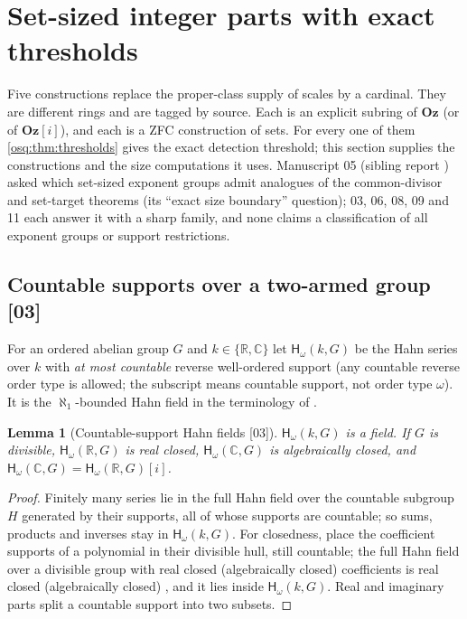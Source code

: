 \documentclass[11pt,letterpaper]{article}
\numberwithin{equation}{section}
\newtheorem{lemma}[lemma]{Lemma}
\theoremstyle{definition}
\theoremstyle{remark}
\theoremstyle{plain}
\newcommand{\Oz}{\mathbf{Oz}}
\newcommand{\GOz}{\Oz[i]}
\newcommand{\R}{\mathbb R}
\newcommand{\C}{\mathbb C}
\newcommand{\Hc}[2]{\mathsf H_{\omega}(#1,#2)}
\newcommand{\src}[1]{\textup{\textsf{[#1]}}}
\begin{document}
\section{Set-sized integer parts with exact thresholds}\label{osq:sec:models}

Five constructions replace the proper-class supply of scales by a cardinal. They are
different rings and are tagged by source. Each is an explicit subring of $\Oz$ (or of
$\GOz$), and each is a ZFC construction of sets. For every one of them
\cref{osq:thm:thresholds} gives the exact detection threshold; this section supplies the
constructions and the size computations it uses. Manuscript 05 (sibling report
\cite{RepoOdg}) asked which set-sized exponent groups admit analogues of the common-divisor
and set-target theorems (its ``exact size boundary'' question); 03, 06, 08, 09 and 11 each
answer it with a sharp family, and none claims a classification of all exponent groups or
support restrictions.

\subsection{Countable supports over a two-armed group \texorpdfstring{\src{03}}{[03]}}\label{osq:sec:model03}

For an ordered abelian group $G$ and $k\in\{\R,\C\}$ let $\Hc kG$ be the Hahn series over $k$
with \emph{at most countable} reverse well-ordered support (any countable reverse order type is
allowed; the subscript means countable support, not order type $\omega$). It is the
$\aleph_1$-bounded Hahn field in the terminology of \cite{LM}.

\begin{lemma}[Countable-support Hahn fields \src{03}]\label{osq:lem:hcfield}
$\Hc kG$ is a field. If $G$ is divisible, $\Hc\R G$ is real closed, $\Hc\C G$ is algebraically
closed, and $\Hc\C G=\Hc\R G[i]$.
\end{lemma}
\begin{proof}
Finitely many series lie in the full Hahn field over the countable subgroup $H$ generated by their
supports, all of whose supports are countable; so sums, products and inverses stay in $\Hc kG$.
For closedness, place the coefficient supports of a polynomial in their divisible hull, still
countable; the full Hahn field over a divisible group with real closed (algebraically closed)
coefficients is real closed (algebraically closed) \cite[Fact~2.1.1]{LM}, and it lies inside
$\Hc kG$. Real and imaginary parts split a countable support into two subsets.
\end{proof}
\end{document}
